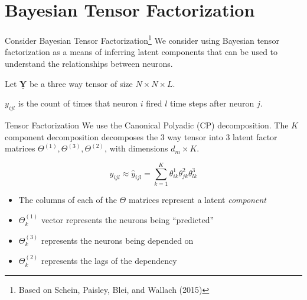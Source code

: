 \documentclass[xcolor=svgnames]{beamer}
\newcommand{\tensor}[1]{
  \ensuremath{\underline{\mathbf{#1}}}}
\begin{document}
\section{Bayesian Tensor Factorization}
\begin{frame}{Consider Bayesian Tensor Factorization\footnote{Based on Schein, Paisley, Blei, and Wallach (2015)}}
	We consider using Bayesian tensor factorization as a means of inferring latent components that can be used to understand the relationships between neurons. \vspace{1em}

	Let $\tensor{Y}$ be a three way tensor of size $N \times N \times L$.

	$y_{ijl}$ is the count of times that neuron $i$ fired $l$ time steps after neuron $j$.


\end{frame}

\begin{frame}{Tensor Factorization}
	We use the Canonical Polyadic (CP) decomposition. The $K$ component decomposition decomposes the 3 way tensor into 3 latent factor matrices $\Theta^{(1)}, \Theta^{(3)}, \Theta^{(2)}$, with dimensions $d_m \times K$. 

	$$y_{ijl} \approx \hat{y}_{ijl} = \sum_{k=1}^K \theta^{1}_{ik} \theta^{2}_{jk} \theta^{3}_{lk}$$

	\begin{itemize}
	\item The columns of each of the $\Theta$ matrices represent a latent \textit{component}
	\item $\Theta^{(1)}_k$ vector represents the neurons being ``predicted''
	\item $\Theta^{(3)}_k$ represents the neurons being depended on
	\item $\Theta^{(2)}_k$ represents the lags of the dependency
	\end{itemize}
\end{frame}
\end{document}
